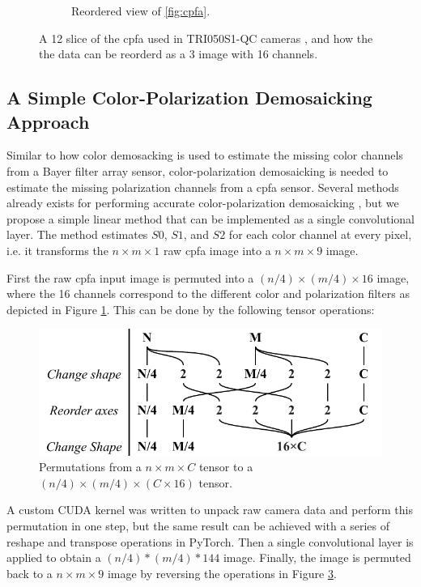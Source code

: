 \begin{figure}[H]
\begin{subfigure}[B]{.48\textwidth}
        \caption{Reordered view of \ref{fig:cpfa}. \label{fig:cpfa_reorder}}
    \end{subfigure}
    \caption{A 12 slice of the \gls{cpfa} used in TRI050S1-QC cameras \cite{lucidvisionlabsTritonMPPolarized2020}, and how the the data can be reorderd as a 3 image with 16 channels. \label{fig:polarization_sensor}}
\end{figure}

\subsection{A Simple Color-Polarization Demosaicking Approach}
Similar to how color demosacking is used to estimate the missing color channels from a Bayer filter array sensor, color-polarization demosaicking is needed to estimate the missing polarization channels from a \gls{cpfa} sensor.
Several methods already exists for performing accurate color-polarization demosaicking \cite{morimatsuMonochromeColorPolarization2020}\cite{morimatsuMonochromeColorPolarization2021}\cite{nguyenTwoStepColorPolarizationDemosaicking2022a}, but we propose a simple linear method that can be implemented as a single convolutional layer.
The method estimates $S0$, $S1$, and $S2$ for each color channel at every pixel, i.e. it transforms the $n \times m \times 1$ raw \gls{cpfa} image into a $n \times m \times 9$ image.

First the raw \gls{cpfa} input image is permuted into a $(n/4) \times (m/4) \times 16$ image, where the 16 channels correspond to the different color and polarization filters as depicted in Figure \ref{fig:cpfa_reorder}.
This can be done by the following tensor operations:
\begin{figure}[H]
    \centering
    \includegraphics[width=.6\textwidth]{figures/transformation.pdf}
    \caption{Permutations from a $n \times m \times C $ tensor to a $(n/4) \times (m/4) \times (C\times 16)$ tensor. \label{fig:reorder_operations}}
    
\end{figure}%
A custom CUDA kernel was written to unpack raw camera data and perform this permutation in one step, but the same result can be achieved with a series of reshape and transpose operations in PyTorch.
Then a single convolutional layer is applied to obtain a $(n/4)*(m/4)*144$ image.
Finally, the image is permuted back to a $n \times m \times 9$ image by reversing the operations in Figure \ref{fig:reorder_operations}.


